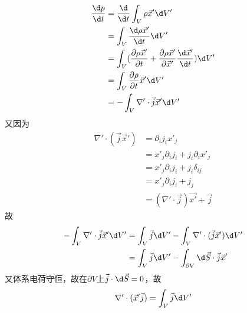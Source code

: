 \documentclass{phyasgn}
\begin{document}
\begin{sol}[1]
  \begin{align*}
    \frac{\d p}{\d t}&=\frac{\d }{\d t}\int_V\rho \vec{x}'\d V'\\
    &=\int_V\frac{\d \rho \vec{x}'}{\d t}\d V'\\
    &=\int_V(\frac{\partial \rho \vec{x}'}{\partial t}+\frac{\partial \rho \vec{x}'}{\partial \vec{x}'}\frac{\d \vec{x}'}{\d t})\d V'\\
    &=\int_V\frac{\partial \rho}{\partial t}\vec{x}'\d V'\\
    &=-\int_V\nabla'\cdot\vec{j}\vec{x}'\d V'
  \end{align*}  
  又因为
  \begin{align*}
    \nabla'\cdot (\vec{j}\vec{x}')&=\partial_ij_ix'_j\\
    &=x'_j\partial_ij_i+j_i\partial_ix'_j\\
    &=x'_j\partial_ij_i+j_i\delta_{ij}\\
    &=x'_j\partial_ij_i+j_j\\
    &=(\nabla'\cdot \vec{j})\vec{x'}+\vec{j}
  \end{align*}
  故\begin{align*}
    -\int_V\nabla'\cdot\vec{j}\vec{x}'\d V'&=\int_V\vec{j}\d V'-\int_V \nabla'\cdot (\vec{j}\vec{x}')\d V'\\
    &=\int_V\vec{j}\d V'-\int_{\partial V} \d \vec{S}\cdot\vec{j}\vec{x}'
  \end{align*}
  又体系电荷守恒，故在$\partial V$上$\vec{j}\cdot\d \vec{S}=0$，故
  \begin{align*}
    \nabla'\cdot (\vec{x}'\vec{j})=\int_V\vec{j}\d V'
  \end{align*}
\end{sol}\par
\end{document}
